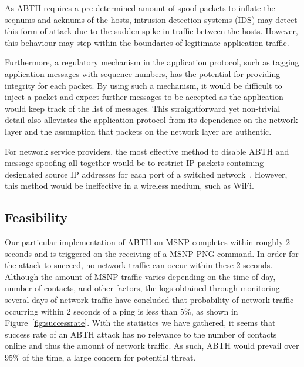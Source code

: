 \documentclass{sig-alternate}
\begin{document}
As ABTH requires a pre-determined amount of spoof packets to inflate the seqnums and acknums of the hosts, intrusion detection systems (IDS) may detect this form of attack due to the sudden spike in traffic between the hosts.
However, this behaviour may step within the boundaries of legitimate application traffic.

Furthermore, a regulatory mechanism in the application protocol, such as tagging application messages with sequence numbers, has the potential for providing integrity for each packet.
By using such a mechanism, it would be difficult to inject a packet and expect further messages to be accepted as the application would keep track of the list of messages.
This straightforward yet non-trivial detail also alleviates the application protocol from its dependence on the network layer and the assumption that packets on the network layer are authentic.

For network service providers, the most effective method to disable ABTH and message spoofing all together would be to restrict IP packets containing designated source IP addresses for each port of a switched network~\cite{templeton:spoof}.
However, this method would be ineffective in a wireless medium, such as WiFi.

\subsection{Feasibility}

Our particular implementation of ABTH on MSNP completes within roughly 2 seconds and is triggered on the receiving of a MSNP PNG command.
In order for the attack to succeed, no network traffic can occur within these 2 seconds.
Although the amount of MSNP traffic varies depending on the time of day, number of contacts, and other factors, the logs obtained through monitoring several days of network traffic have concluded that probability of network traffic occurring within 2 seconds of a ping is less than 5\%, as shown in Figure~\ref{fig:successrate}.
With the statistics we have gathered, it seems that success rate of an ABTH attack has no relevance to the number of contacts online and thus the amount of network traffic.
As such, ABTH would prevail over 95\% of the time, a large concern for potential threat.
\end{document}
